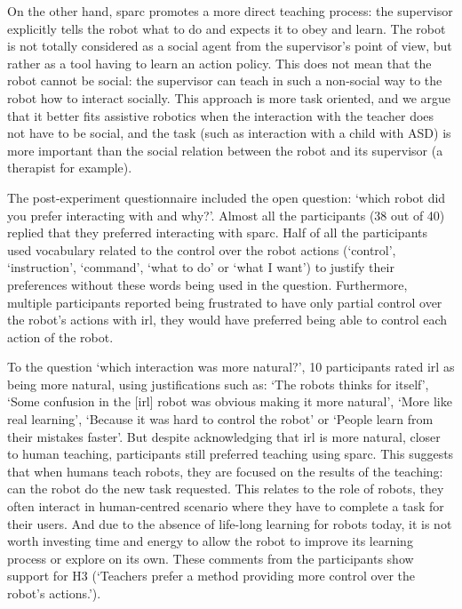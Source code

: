On the other hand, \gls{sparc} promotes a more direct teaching process: the supervisor explicitly tells the robot what to do and expects it to obey and learn. The robot is not totally considered as a social agent from the supervisor's point of view, but rather as a tool having to learn an action policy. This does not mean that the robot cannot be social: the supervisor can teach in such a non-social way to the robot how to interact socially. This approach is more task oriented, and we argue that it better fits assistive robotics when the interaction with the teacher does not have to be social, and the task (such as interaction with a child with \gls{ASD}) is more important than the social relation between the robot and its supervisor (a therapist for example).

The post-experiment questionnaire included the open question: `which robot did you prefer interacting with and why?'. Almost all the participants (38 out of 40) replied that they preferred interacting with \gls{sparc}. Half of all the participants used vocabulary related to the control over the robot actions (`control', `instruction', `command', `what to do' or `what I want') to justify their preferences without these words being used in the question. Furthermore, multiple participants reported being frustrated to have only partial control over the robot's actions with \gls{irl}, they would have preferred being able to control each action of the robot. 

To the question `which interaction was more natural?', 10 participants rated \gls{irl} as being more natural, using justifications such as: `The robots thinks for itself', `Some confusion in the [\gls{irl}] robot was obvious making it more natural', `More like real learning', `Because it was hard to control the robot' or `People learn from their mistakes faster'. But despite acknowledging that \gls{irl} is more natural, closer to human teaching, participants still preferred teaching using \gls{sparc}. This suggests that when humans teach robots, they are focused on the results of the teaching: can the robot do the new task requested. This relates to the role of robots, they often interact in human-centred scenario where they have to complete a task for their users. And due to the absence of life-long learning for robots today, it is not worth investing time and energy to allow the robot to improve its learning process or explore on its own. These comments from the participants show support for H3 (`Teachers prefer a method providing more control over the robot's actions.').

